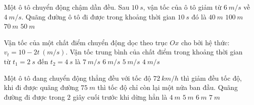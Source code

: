 \begin{ex}%
Một ô tô chuyển động chậm dần đều. Sau $10\ s$, vận tốc của ô tô giảm từ $6\ m/s$ về $4\ m/s$. Quãng đường ô tô đi được trong khoảng thời gian $10\ s$ đó là
\choice
{$40\ m$}
{$100\ m$}
{$70\ m$}
{\True $50\ m$}
\loigiai{
}
 \end{ex}
\begin{ex}%
Vận tốc của một chất điểm chuyển động dọc theo trục $Ox$ cho bởi hệ thức: $v_t=10-2t\ (m/s)$. Vận tốc trung bình của chất điểm trong khoảng thời gian từ $t_1 = 2\ s$ đến $t_2 = 4\ s$ là
\choice
{$7\ m/s$}
{$6\ m/s$}
{$5\ m/s$}
{\True $4\ m/s$}
 \end{ex}
\begin{ex}%
Một ô tô đang chuyển động thẳng đều với tốc độ $72\ km/h$ thì giảm đều tốc độ, khi đi được quãng đường $75\ m$ thì tốc độ chỉ còn lại một nửa ban đầu. Quãng đường đi được trong $2$ giây cuối trước khi dừng hẳn là
\choice
{\True $4\ m$}
{$5\ m$}
{$6\ m$}
{$7\ m$}
 \end{ex}
